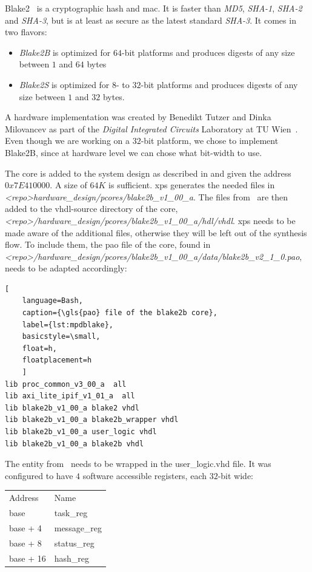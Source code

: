 Blake2~\cite{blake2} is a cryptographic hash and \gls{mac}. It is faster than
\emph{MD5}, \emph{SHA-1}, \emph{SHA-2} and \emph{SHA-3}, but is at least as
secure as the latest standard \emph{SHA-3}.
It comes in two flavors:
\begin{itemize}
	\item \emph{Blake2B} is optimized for $64$-bit platforms and produces
		digests of any size between $1$ and $64$ bytes
	\item \emph{Blake2S} is optimized for $8$- to $32$-bit platforms and
		produces digests of any size between $1$ and $32$ bytes.
\end{itemize}

A hardware implementation was created by Benedikt Tutzer and Dinka Milovancev as
part of the \emph{Digital Integrated Circuits} Laboratory at TU
Wien~\cite{blake2hardware}.
Even though we are working on a $32$-bit platform, we chose to implement
Blake2B, since at hardware level we can chose what bit-width to use.

The core is added to the system design as described in
 and given the address $0x7E410000$. A size of
$64K$ is sufficient.
\gls{xps} generates the needed files in
\emph{<repo>hardware\_design/pcores/blake2b\_v1\_00\_a}.
The files from~\cite{blake2hardware} are then added to the vhdl-source directory
of the core,\\
\emph{<repo>/hardware\_design/pcores/blake2b\_v1\_00\_a/hdl/vhdl}.
\gls{xps} needs to be made aware of the additional files, otherwise they will be
left out of the synthesis flow.
To include them, the \gls{pao} file of the core, found in
\emph{<repo>/hardware\_design/pcores/blake2b\_v1\_00\_a/data/blake2b_v2_1_0.pao},
needs to be adapted accordingly:

\begin{lstlisting}[
	language=Bash,
	caption={\gls{pao} file of the blake2b core},
	label={lst:mpdblake},
	basicstyle=\small,
	float=h,
	floatplacement=h
	]
lib proc_common_v3_00_a  all 
lib axi_lite_ipif_v1_01_a  all 
lib blake2b_v1_00_a blake2 vhdl
lib blake2b_v1_00_a blake2b_wrapper vhdl
lib blake2b_v1_00_a user_logic vhdl
lib blake2b_v1_00_a blake2b vhdl
\end{lstlisting}

The entity from~\cite{blake2hardware} needs to be wrapped in the user\_logic.vhd
file.
It was configured to have $4$ software accessible registers, each $32$-bit wide:

\begin{tabular}{ll}
	Address & Name \\
	base     & task\_reg\\
	base + 4 & message\_reg\\
	base + 8 & status\_reg\\
	base + 16 & hash\_reg\\
\end{tabular}

